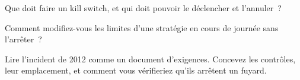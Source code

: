 \begin{interviewq}\label{iq:ll:pre-trade-risk-and-kill-switches:4}
Que doit faire un kill switch, et qui doit pouvoir le déclencher et l'annuler~?
\end{interviewq}

\begin{interviewq}\label{iq:ll:pre-trade-risk-and-kill-switches:5}
Comment modifiez-vous les limites d'une stratégie en cours de journée sans l'arrêter~?
\end{interviewq}

\begin{interviewq}\label{iq:ll:pre-trade-risk-and-kill-switches:6}
Lire l'incident de 2012 comme un document d'exigences. Concevez les contrôles, leur emplacement, et comment vous vérifieriez qu'ils arrêtent un
fuyard.
\end{interviewq}

